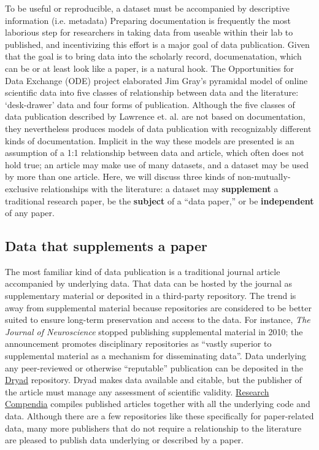\documentclass[10pt,a4paper,twocolumn]{article}
\begin{document}
{To be useful or reproducible, a dataset must be accompanied by descriptive information (i.e. metadata)\cite{gray_online_2002}
Preparing documentation is frequently the most laborious step for researchers in taking data from useable within their lab to published, and incentivizing this effort is a major goal of data publication.
Given that the goal is to bring data into the scholarly record, documenatation, which can be or at least look like a paper, is a natural hook.
The Opportunities for Data Exchange (ODE) project elaborated Jim Gray's pyramidal model of online scientific data\cite{gray_jim_2009} into five classes of relationship between data and the literature: `desk-drawer' data and four forms of publication\cite{reilly_report_2011}.
Although the five classes of data publication described by Lawrence et. al. are not based on documentation, they nevertheless produces models of data publication with recognizably different kinds of documentation.
Implicit in the way these models are presented is an assumption of a 1:1 relationship between data and article, which often does not hold true; an article may make use of many datasets, and a dataset may be used by more than one article.
Here, we will discuss three kinds of non-mutually-exclusive relationships with the literature: a dataset may \textbf{supplement} a traditional research paper, be the \textbf{subject} of a ``data paper,'' or be \textbf{independent} of any paper.

\subsection*{Data that supplements a paper}\label{paper-supplement-data}

The most familiar kind of data publication is a traditional journal article accompanied by underlying data.
That data can be hosted by the journal as supplementary material or deposited in a third-party repository.
The trend is away from supplemental material because repositories are considered to be better suited to ensure long-term preservation and access to the data.
For instance, \emph{The Journal of Neuroscience} stopped publishing supplemental material in 2010; the announcement promotes disciplinary repositories as ``vastly superior to supplemental material as a mechanism for disseminating data''\cite{maunsell_announcement_2010}.
Data underlying any peer-reviewed or otherwise ``reputable'' publication can be deposited in the \href{http://datadryad.org/}{Dryad} repository.
Dryad makes data available and citable, but the publisher of the article must manage any assessment of scientific validity.
\href{http://researchcompendia.org/}{Research Compendia} compiles published articles together with all the underlying code and data.
Although there are a few repositories like these specifically for paper-related data, many more publishers that do not require a relationship to the literature are pleased to publish data underlying or described by a paper.

}
\end{document}
